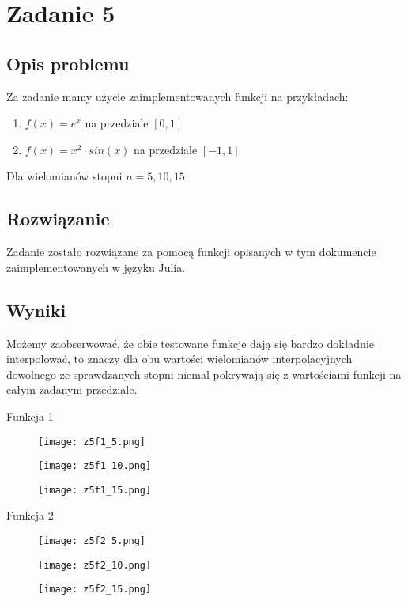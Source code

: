 \documentclass[10pt]{article}
\begin{document}
\section{Zadanie 5}
\subsection{Opis problemu}
Za zadanie mamy użycie zaimplementowanych funkcji na przykładach:
\begin{enumerate}
    \item $f(x) = e^x$ na przedziale $[0, 1]$
    \item $f(x) = x^2 \cdot sin(x)$ na przedziale $[-1, 1]$
\end{enumerate}
Dla wielomianów stopni $n = 5,10,15$
\subsection{Rozwiązanie}
Zadanie zostało rozwiązane za pomocą funkcji opisanych w tym dokumencie zaimplementowanych w języku Julia.
\subsection{Wyniki}
Możemy zaobserwować, że obie testowane funkcje dają się bardzo dokładnie interpolować, to znaczy dla obu wartości wielomianów interpolacyjnych dowolnego ze sprawdzanych stopni niemal pokrywają się z wartościami funkcji na całym zadanym przedziale.
\begin{center}
    \Huge{Funkcja 1}
\end{center}
\begin{figure}[H]
    \centering
    \texttt{[image: z5f1\_5.png]}
    \label{fig:enter-label}
\end{figure}
\begin{figure}[H]
    \centering
    \texttt{[image: z5f1\_10.png]}
    \label{fig:enter-label}
\end{figure}
\begin{figure}[H]
    \centering
    \texttt{[image: z5f1\_15.png]}
    \label{fig:enter-label}
\end{figure}
\begin{center}
    \Huge{Funkcja 2}
\end{center}
\begin{figure}[H]
    \centering
    \texttt{[image: z5f2\_5.png]}
    \label{fig:enter-label}
\end{figure}
\begin{figure}[H]
    \centering
    \texttt{[image: z5f2\_10.png]}
    \label{fig:enter-label}
\end{figure}
\begin{figure}[H]
    \centering
    \texttt{[image: z5f2\_15.png]}
    \label{fig:enter-label}
\end{figure}
\end{document}
